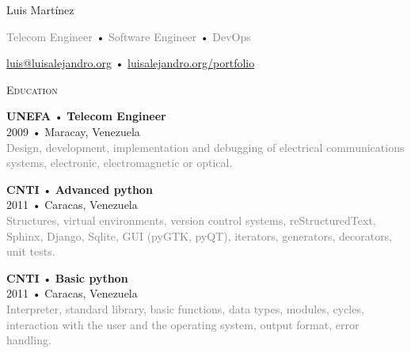 \documentclass[12pt]{article}
\begin{document}
\centering
\begin{cv}{Luis Mart\'inez}
  
  \vspace{0.25em}
  \textcolor{gray}{Telecom Engineer} •
  \textcolor{gray}{Software Engineer} •
  \textcolor{gray}{DevOps}

  \vspace{0.125em}
  \href{mailto:luis@luisalejandro.org}{luis@luisalejandro.org} •
  \href{https://luisalejandro.org/portfolio}{luisalejandro.org/portfolio}
  \vspace{0.125em}

  \hrulefill

  \begin{minipage}[t]{0.35\textwidth}
    \vspace{0.125em}
    
    \begin{minipage}{\linewidth}
      \textrm{\textsc{\Large{Education}}}
      \newline
      \parbox[t]{\linewidth}{
        \textbf{UNEFA} • \textrm{\textbf{Telecom Engineer}}\\
        2009 • Maracay, Venezuela\\
        \footnotesize{\textcolor{gray}{Design, development, implementation and debugging of electrical communications systems, electronic, electromagnetic or optical.}}\\
      }
      \newline
      \parbox[t]{\linewidth}{
        \textbf{CNTI} • \textrm{\textbf{Advanced python}}\\
        2011 • Caracas, Venezuela\\
        \footnotesize{\textcolor{gray}{Structures, virtual environments, version control systems, reStructuredText, Sphinx, Django, Sqlite, GUI (pyGTK, pyQT), iterators, generators, decorators, unit tests.}}\\
      }
      \newline
      \parbox[t]{\linewidth}{
        \textbf{CNTI} • \textrm{\textbf{Basic python}}\\
        2011 • Caracas, Venezuela\\
        \footnotesize{\textcolor{gray}{Interpreter, standard library, basic functions, data types, modules, cycles, interaction with the user and the operating system, output format, error handling.}}\\
      }
      \newline
    \end{minipage}


\end{minipage}
\end{cv}
\end{document}
